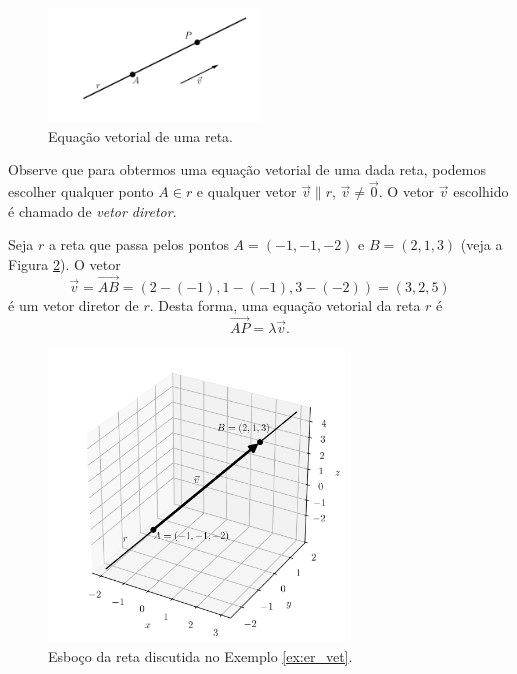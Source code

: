\begin{figure}[H]
  \centering
  \includegraphics[width=0.5\textwidth]{./cap_er/dados/fig_er_vet/fig_er_vet}
  \caption{Equação vetorial de uma reta.}
  \label{fig:er_vet}
\end{figure}

Observe que para obtermos uma equação vetorial de uma dada reta, podemos escolher qualquer ponto $A\in r$ e qualquer vetor $\vec{v}\parallel r$, $\vec{v}\neq\vec{0}$. O vetor $\vec{v}$ escolhido é chamado de \emph{vetor diretor}.

\begin{ex}\label{ex:er_vet}
  Seja $r$ a reta que passa pelos pontos $A=(-1,-1,-2)$ e $B = (2,1,3)$ (veja a Figura \ref{fig:ex_er_vet}). O vetor
  \begin{equation}
    \vec{v} = \overrightarrow{AB} = (2-(-1),1-(-1),3-(-2)) = (3,2,5)
  \end{equation}
  é um vetor diretor de $r$. Desta forma, uma equação vetorial da reta $r$ é
  \begin{equation}
    \overrightarrow{AP} = \lambda\vec{v}.
  \end{equation}
  \begin{figure}[H]
    \centering
    \includegraphics[width=0.7\textwidth]{./cap_er/dados/fig_ex_er_vet/fig_ex_er_vet}
    \caption{Esboço da reta discutida no Exemplo \ref{ex:er_vet}.}
    \label{fig:ex_er_vet}
  \end{figure}  
\end{ex}


